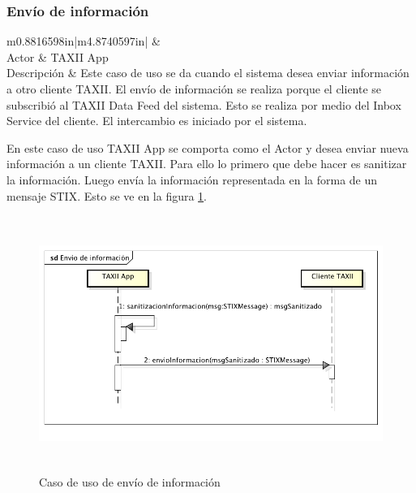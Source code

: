\subsubsection{Envío de información}
\begin{flushleft}
	\tablefirsthead{}
	\tablehead{}
	\tabletail{}
	\tablelasttail{}
	\begin{supertabular}{m{0.8816598in}|m{4.8740597in}|}
		 &
		\\\hline
		{Actor} &
		{TAXII App}\\
		{Descripción} &
		{Este caso de uso se da cuando el sistema desea enviar información a otro cliente
			TAXII. El envío de información se realiza porque el cliente se subscribió al TAXII Data Feed del sistema. Esto se
			realiza por medio del Inbox Service del cliente. El intercambio es iniciado por el sistema.}\\\hhline{~-}
	\end{supertabular}
\end{flushleft}
\bigskip
	En este caso de uso TAXII App se comporta como el Actor y desea enviar nueva información a un cliente TAXII. Para ello
	lo primero que debe hacer es sanitizar la información. Luego envía la información representada en la forma de un
	mensaje STIX. Esto se ve en la figura \ref{fig.enviodeinfo}.
	
\begin{figure}[H]
	\centering  \includegraphics[width=5.7638in,height=3.2764in]{Analisis22-img/Analisis22-img029.png}
	\caption{Caso de uso de envío de información}
	\label{fig.enviodeinfo}
\end{figure}

